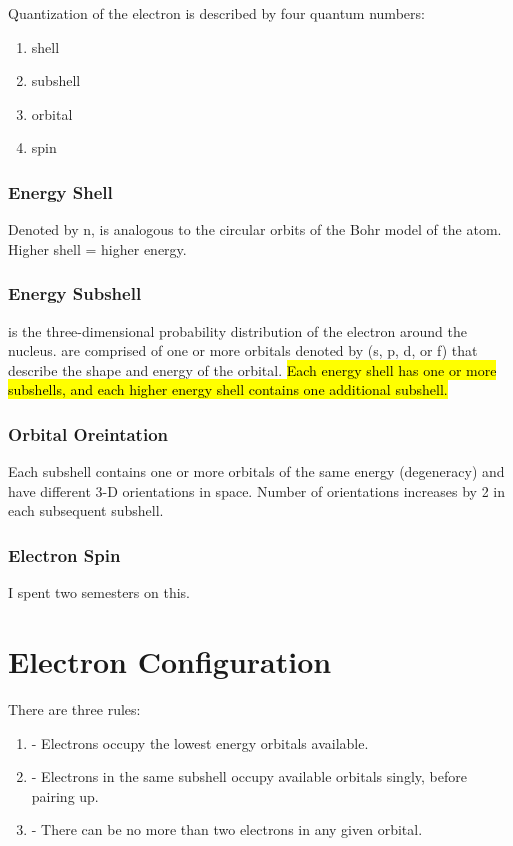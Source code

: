 \documentclass[../GChemReview.tex]{subfiles}
\begin{document}
  Quantization of the electron is described by four quantum numbers:
  \begin{enumerate}
    \item shell
    \item subshell
    \item orbital
    \item spin
  \end{enumerate}

  \subsubsection{Energy Shell}

  Denoted by n, is analogous to the circular orbits of the Bohr model of the
  atom. Higher shell = higher energy.

  \subsubsection{Energy Subshell}

   is the three-dimensional probability distribution of the
  electron around the nucleus.  are comprised of one or more
  orbitals denoted by (s, p, d, or f) that describe the shape and energy of the
  orbital. \hl{Each energy shell has one or more subshells, and each higher
  energy shell contains one additional subshell.} 

  \subsubsection{Orbital Oreintation}

  Each subshell contains one or more orbitals of the same energy (degeneracy)
  and have different 3-D orientations in space. Number of orientations increases
  by 2 in each subsequent subshell.

  \subsubsection{Electron Spin}

  I spent two semesters on this.

  \section{Electron Configuration}

  There are three rules:

  \begin{enumerate}
    \item {} - Electrons occupy the lowest energy orbitals
      available.  
    \item {} - Electrons in the same subshell occupy available
      orbitals singly, before pairing up.  
    \item {} - There can be no more than two
      electrons in any given orbital.
  \end{enumerate}
\end{document}

